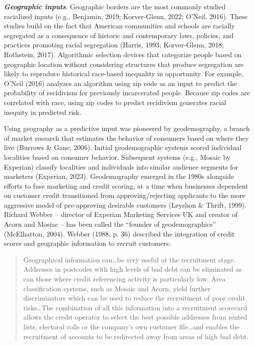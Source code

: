 \documentclass[
  12pt,
]{article}
\begin{document}
\textbf{\emph{Geographic inputs}}. Geographic borders are the most commonly studied racialized inputs (e.g., Benjamin, 2019; Korver-Glenn, 2022; O'Neil, 2016). These studies build on the fact that American communities and schools are racially segregated as a consequence of historic and contemporary laws, policies, and practices promoting racial segregation (Harris, 1993; Korver-Glenn, 2018; Rothstein, 2017). Algorithmic selection devices that categorize people based on geographic location without considering structures that produce segregation are likely to reproduce historical race-based inequality in opportunity. For example, O'Neil (2016) analyzes an algorithm using zip code as an input to predict the probability of recidivism for previously incarcerated people. Because zip codes are correlated with race, using zip codes to predict recidivism generates racial inequity in predicted risk.

Using geography as a predictive input was pioneered by geodemography, a branch of market research that estimates the behavior of consumers based on where they live (Burrows \& Gane, 2006). Initial geodemographic systems scored individual localities based on consumer behavior. Subsequent systems (e.g., Mosaic by Experian) classify localities and individuals into similar audience segments for marketers (Experian, 2023). Geodemography emerged in the 1980s alongside efforts to fuse marketing and credit scoring, at a time when businesses dependent on customer credit transitioned from approving/rejecting applicants to the more aggressive model of pre-approving desirable customers (Leyshon \& Thrift, 1999). Richard Webber -- director of Experian Marketing Services UK and creator of Acorn and Mosiac -- has been called the ``founder of geodemographics'' (McElhatton, 2004). Webber (1988, p. 36) described the integration of credit scores and geographic information to recruit customers:

\begin{quote}
Geographical information can\ldots be very useful at the recruitment stage. Addresses in postcodes with high levels of bad debt can be eliminated as can those where credit referencing activity is particularly low. Area classification systems, such as Mosaic and Acorn, yield further discriminators which can be used to reduce the recruitment of poor credit risks\ldots The combination of all this information into a recruitment scorecard allows the credit operator to select the best possible addresses from rented lists, electoral rolls or the company's own customer file\ldots and enables the recruitment of accounts to be redirected away from areas of high bad debt.
\end{quote}
\end{document}
